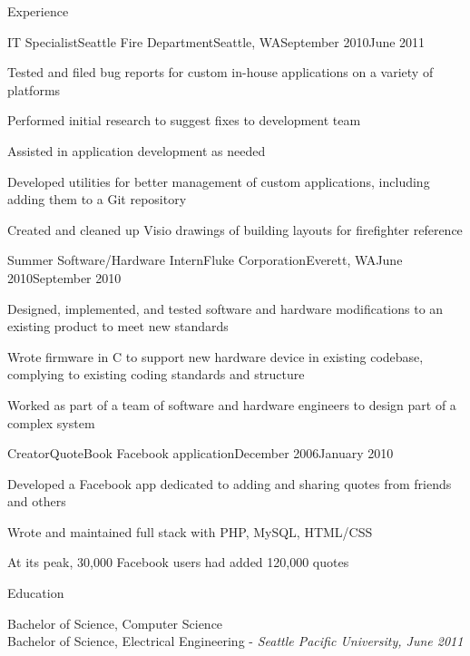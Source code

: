 \documentclass[letterpaper,10pt]{article}
\begin{document}
\begin{res_section}{Experience}
\begin{res_experienceitem}{IT Specialist}{Seattle Fire Department}{Seattle, WA}{September 2010}{June 2011}
  \item Tested and filed bug reports for custom in-house applications on a variety of platforms
  \item Performed initial research to suggest fixes to development team
  \item Assisted in application development as needed
  \item Developed utilities for better management of custom applications, including adding them to a Git repository
  \item Created and cleaned up Visio drawings of building layouts for firefighter reference
\end{res_experienceitem}
\begin{res_experienceitem}{Summer Software/Hardware Intern}{Fluke Corporation}{Everett, WA}{June 2010}{September 2010}
  \item Designed, implemented, and tested software and hardware modifications to an existing product to meet new standards
  \item Wrote firmware in C to support new hardware device in existing codebase, complying to existing coding standards and structure
  \item Worked as part of a team of software and hardware engineers to design part of a complex system
\end{res_experienceitem}
\begin{res_experienceitem}{Creator}{QuoteBook Facebook application}{}{December 2006}{January 2010}
  \item Developed a Facebook app dedicated to adding and sharing quotes from friends and others
  \item Wrote and maintained full stack with PHP, MySQL, HTML/CSS
  \item At its peak, 30,000 Facebook users had added 120,000 quotes
\end{res_experienceitem}
\end{res_section}

\begin{res_section}{Education}
\begin{res_content}{Bachelor of Science, Computer Science\\
Bachelor of Science, Electrical Engineering - \em{Seattle Pacific University, June 2011}
}
\end{res_content}
\end{res_section}
\end{document}
